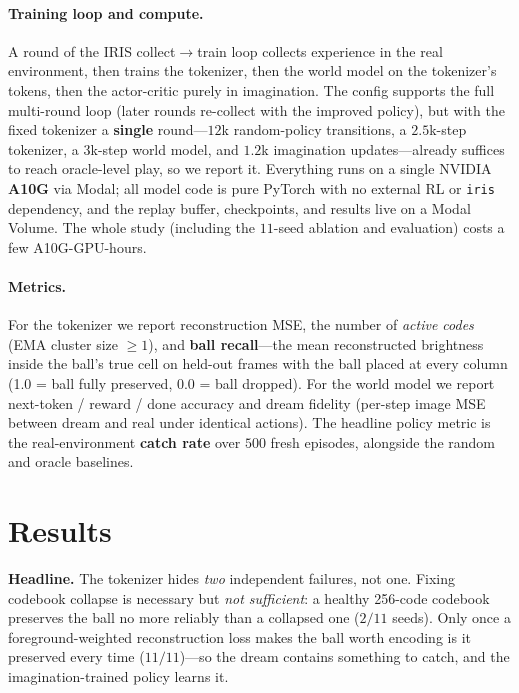 \documentclass[11pt]{article}
\newcommand{\activeAfter}{256}
\newcommand{\nseeds}{11}
\newcommand{\keptEMA}{2}
\newcommand{\keptFG}{11}
\begin{document}
\paragraph{Training loop and compute.} A round of the IRIS
collect$\rightarrow$train loop collects experience in the real environment, then
trains the tokenizer, then the world model on the tokenizer's tokens, then the
actor-critic purely in imagination. The config supports the full multi-round loop
(later rounds re-collect with the improved policy), but with the fixed tokenizer a
\textbf{single} round---$12$k random-policy transitions, a $2.5$k-step tokenizer,
a $3$k-step world model, and $1.2$k imagination updates---already suffices to
reach oracle-level play, so we report it. Everything runs on a single NVIDIA
\textbf{A10G} via Modal; all model code is pure PyTorch with no external RL or
\texttt{iris} dependency, and the replay buffer, checkpoints, and results live on
a Modal Volume. The whole study (including the $\nseeds$-seed ablation and
evaluation) costs a few A10G-GPU-hours.

\paragraph{Metrics.} For the tokenizer we report reconstruction MSE, the number
of \emph{active codes} (EMA cluster size $\ge 1$), and \textbf{ball recall}---the
mean reconstructed brightness inside the ball's true cell on held-out frames with
the ball placed at every column (1.0 = ball fully preserved, 0.0 = ball dropped).
For the world model we report next-token / reward / done accuracy and dream
fidelity (per-step image MSE between dream and real under identical actions). The
headline policy metric is the real-environment \textbf{catch rate} over $500$
fresh episodes, alongside the random and oracle baselines.

\section{Results}
\label{sec:results}

\begin{keybox}
\textbf{Headline.} The tokenizer hides \emph{two} independent failures, not one.
Fixing codebook collapse is necessary but \emph{not sufficient}: a healthy
\activeAfter-code codebook preserves the ball no more reliably than a collapsed
one ($\keptEMA/\nseeds$ seeds). Only once a foreground-weighted reconstruction
loss makes the ball worth encoding is it preserved every time
($\keptFG/\nseeds$)---so the dream contains something to catch, and the
imagination-trained policy learns it.
\end{keybox}
\end{document}

